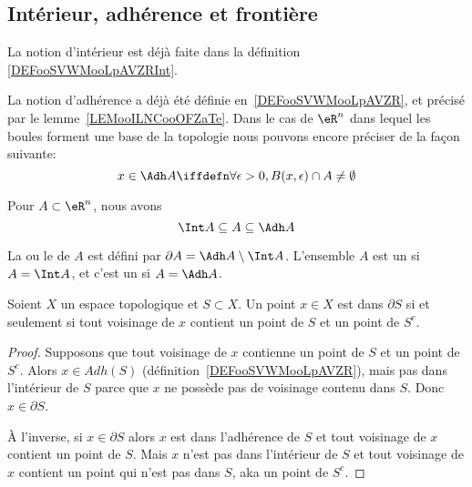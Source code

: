 \subsection{Intérieur, adhérence et frontière}

\begin{normaltext}
La notion d'intérieur est déjà faite dans la définition \ref{DEFooSVWMooLpAVZRInt}.

La notion d'adhérence a déjà été définie en~\ref{DEFooSVWMooLpAVZR}, et précisé par le lemme~\ref{LEMooILNCooOFZaTe}. Dans le cas de \( \eR^n\) dans lequel les boules forment une base de la topologie nous pouvons encore préciser de la façon suivante:
\begin{equation}
	x \in \Adh A \iffdefn \forall \epsilon > 0, B(x,\epsilon) \cap A \neq \emptyset
\end{equation}
\end{normaltext}

\begin{proposition}
Pour $A \subset \eR^n$, nous avons
\begin{equation*}
	\Int A \subseteq A  \subseteq \Adh A
\end{equation*}
\end{proposition}

\begin{definition}      \label{DEFooACVLooRwehTl}
  La  ou le  de $A$ est défini par $\partial A = \Adh A \setminus \Int A$. L'ensemble $A$ est un  si $A = \Int A$, et c'est un  si $A = \Adh A$.
\end{definition}

\begin{lemma}      \label{LEMooEUYEooYcUfKr}
    Soient \( X\) un espace topologique et \( S\subset X\). Un point \( x\in X\) est dans \( \partial S\) si et seulement si tout voisinage de \( x\) contient un point de \( S\) et un point de \( S^c\).
\end{lemma}

\begin{proof}
    Supposons que tout voisinage de \( x\) contienne un point de \( S\) et un point de \( S^c\). Alors \( x\in Adh(S)\) (définition~\ref{DEFooSVWMooLpAVZR}), mais pas dans l'intérieur de \( S\) parce que \( x\) ne possède pas de voisinage contenu dans \( S\). Donc \( x\in \partial S\).

    À l'inverse, si \( x\in\partial S\) alors \( x\) est dans l'adhérence de \( S\) et tout voisinage de \( x\) contient un point de \( S\). Mais \( x\) n'est pas dans l'intérieur de \( S\) et tout voisinage de \( x\) contient un point qui n'est pas dans \( S\), aka un point de \( S^c\).
\end{proof}

